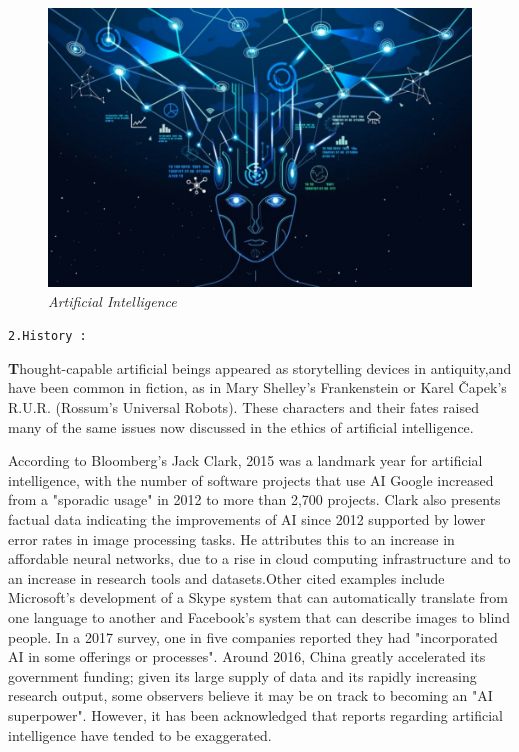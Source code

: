 \documentclass{article}
\begin{document}
\begin{figure}[h]
\centering
\includegraphics[scale=0.19]{AI 1st Image}
\caption{\textit{Artificial Intelligence}}
\end{figure}

\begin{large}
\texttt{2.History :}\\
\end{large}

\textbf{\Huge T}hought-capable artificial beings appeared as storytelling devices in antiquity,and have been common in fiction, as in Mary Shelley's Frankenstein or Karel Čapek's R.U.R. (Rossum's Universal Robots). These characters and their fates raised many of the same issues now discussed in the ethics of artificial intelligence.


According to Bloomberg's Jack Clark, 2015 was a landmark year for artificial intelligence, with the number of software projects that use AI Google increased from a "sporadic usage" in 2012 to more than 2,700 projects. Clark also presents factual data indicating the improvements of AI since 2012 supported by lower error rates in image processing tasks. He attributes this to an increase in affordable neural networks, due to a rise in cloud computing infrastructure and to an increase in research tools and datasets.Other cited examples include Microsoft's development of a Skype system that can automatically translate from one language to another and Facebook's system that can describe images to blind people. In a 2017 survey, one in five companies reported they had "incorporated AI in some offerings or processes". Around 2016, China greatly accelerated its government funding; given its large supply of data and its rapidly increasing research output, some observers believe it may be on track to becoming an "AI superpower". However, it has been acknowledged that reports regarding artificial intelligence have tended to be exaggerated.\\\\
\end{document}
